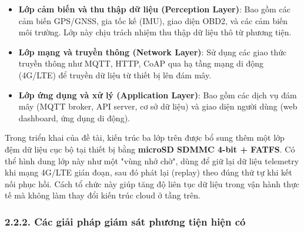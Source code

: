 \documentclass[a4paper]{extarticle}
\providecommand{\tightlist}{%
  \setlength{\itemsep}{0pt}\setlength{\parskip}{0pt}}
\begin{document}
\begin{itemize}
\tightlist
\item
  \textbf{Lớp cảm biến và thu thập dữ liệu (Perception Layer)}: Bao gồm
  các cảm biến GPS/GNSS, gia tốc kế (IMU), giao diện OBD2, và các cảm
  biến môi trường. Lớp này chịu trách nhiệm thu thập dữ liệu thô từ
  phương tiện.
\item
  \textbf{Lớp mạng và truyền thông (Network Layer)}: Sử dụng các giao
  thức truyền thông như MQTT, HTTP, CoAP qua hạ tầng mạng di động
  (4G/LTE) để truyền dữ liệu từ thiết bị lên đám mây.
\item
  \textbf{Lớp ứng dụng và xử lý (Application Layer)}: Bao gồm các dịch
  vụ đám mây (MQTT broker, API server, cơ sở dữ liệu) và giao diện người
  dùng (web dashboard, ứng dụng di động).
\end{itemize}

Trong triển khai của đề tài, kiến trúc ba lớp trên được bổ sung thêm một
lớp đệm dữ liệu cục bộ tại thiết bị bằng \textbf{microSD SDMMC 4-bit +
FATFS}. Có thể hình dung lớp này như một "vùng nhớ chờ", dùng để giữ lại
dữ liệu telemetry khi mạng 4G/LTE gián đoạn, sau đó phát lại (replay)
theo đúng thứ tự khi kết nối phục hồi. Cách tổ chức này giúp tăng độ
liên tục dữ liệu trong vận hành thực tế mà không làm thay đổi kiến trúc
cloud ở tầng trên.

\subsubsection{2.2.2. Các giải pháp giám sát phương tiện hiện
có}\label{222-cuxe1c-giux1ea3i-phuxe1p-giuxe1m-suxe1t-phux1b0ux1a1ng-tiux1ec7n-hiux1ec7n-cuxf3}
\end{document}
